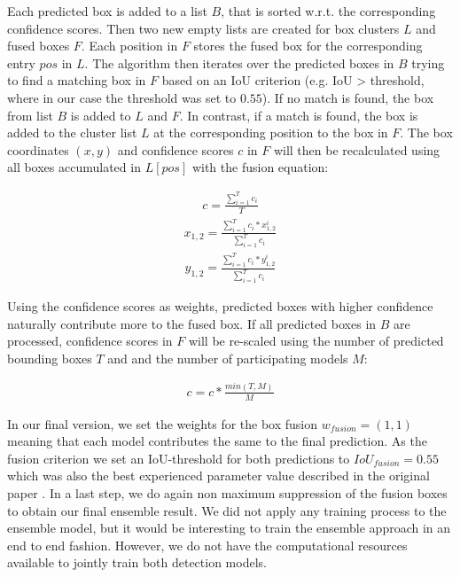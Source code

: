 Each predicted box is added to a list $B$, that is sorted w.r.t. the corresponding confidence scores. Then two new empty lists are created for box clusters $L$ and fused boxes $F$. Each position in $F$ stores the fused box for the corresponding entry $pos$ in $L$. The algorithm then iterates over the predicted boxes in $B$ trying to find a matching box in $F$ based on an \acs{IoU} criterion (e.g. \acs{IoU} > threshold, where in our case the threshold was set to $0.55$). If no match is found, the box from list $B$ is added to $L$ and $F$. In contrast, if a match is found, the box is added to the cluster list $L$ at the corresponding position to the box in $F$. The box coordinates $(x,y)$ and confidence scores $c$ in $F$ will then be recalculated using all boxes accumulated in $L[pos]$ with the fusion equation:

\begin{align}
	c = \frac{\sum_{i=1}^{T}c_i}{T}
\end{align}
\begin{align}
	x_{1,2} = \frac{\sum_{i=1}^{T} c_i * x_{1,2}^i}{\sum_{i=1}^{T} c_i}
\end{align}
\begin{align}
	y_{1,2} = \frac{\sum_{i=1}^{T} c_i * y_{1,2}^i}{\sum_{i=1}^{T} c_i}
\end{align}

Using the confidence scores as weights, predicted boxes with higher confidence naturally contribute more to the fused box.
If all predicted boxes in $B$ are processed, confidence scores in $F$ will be re-scaled using the number of predicted bounding boxes $T$ and and the number of participating models $M$:

\begin{align}
	c = c * \frac{min(T,M)}{M}
\end{align}

In our final version, we set the weights for the box fusion $w_{fusion} = (1,1)$ meaning that each model contributes the same to the final prediction.
As the fusion criterion we set an \ac{IoU}-threshold for both predictions to $IoU_{fusion} = 0.55$ which was also the best experienced parameter value described in the original paper \autocite{weightedBoxFusion}. In a last step, we do again non maximum suppression of the fusion boxes to obtain our final ensemble result. 
We did not apply any training process to the ensemble model, but it would be interesting to train the ensemble approach in an end to end fashion. However, we do not have the computational resources available to jointly train both detection models.



